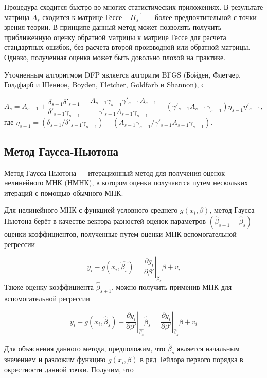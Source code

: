 Процедура сходится быстро во многих статистических приложениях. В результате матрица $A_s$ сходится к матрице Гессе $- H^{-1}_s$ --- более предпочтительной с точки зрения теории. В принципе данный метод может позволять получить приближенную оценку обратной матрицы к матрице Гессе для расчета стандартных ошибок, без расчета второй производной или обратной матрицы. Однако, полученная оценка может быть довольно плохой на практике.

Уточненным алгоритмом DFP является алгоритм BFGS (Бойден, Флетчер, Голдфарб и Шеннон, Boyden, Fletcher, Goldfarb и Shannon), с

\begin{equation}
A_s = A_{s-1}+\dfrac{\delta_{s-1}\delta'_{s-1}}{\delta'_{s-1}\gamma_{s-1}}+\dfrac{A_{s-1}\gamma_{s-1}\gamma'_{s-1}A_{s-1}}{\gamma'_{s-1}A_{s-1}\gamma_{s-1}}
-(\gamma'_{s-1}A_{s-1}\gamma_{s-1})\eta_{s-1}\eta'_{s-1},
\end{equation}
где $\eta_{s-1} = (\delta_{s-1}/\delta'_{s-1}\gamma_{s-1})-(A_{s-1}\gamma_{s-1}/\gamma'_{s-1}A_{s-1}\gamma_{s-1})$.


\subsection{Метод Гаусса-Ньютона}

Метод Гаусса-Ньютона --- итерационный метод для получения оценок нелинейного МНК (НМНК), в котором оценки получаются путем нескольких итераций с помощью обычного МНК. 

Для нелинейного МНК с функцией условного среднего $g({x_i},\beta)$, метод Гаусса-Ньютона берёт в качестве вектора разностей оценок параметров $(\hat{\beta}_{s+1}-\hat{\beta}_s)$ оценки коэффициентов, полученные путем оценки МНК вспомогательной регрессии

\begin{equation}
y_{i}-g(x_{i},\hat{\beta_s})= \left. \frac{\partial{g_i}}{\partial{\beta}'} \right|_{\hat{\beta}_s} \beta+v_{i}
\end{equation}
Также оценку коэффициента $\hat{\beta}_{s+1}$, можно получить применив МНК для вспомогательной регрессии

\begin{equation}
\left. y_{i}-g(x_{i},\hat{\beta}_s)-\dfrac{\partial{g_i}}{\partial{\beta}'} \right|_{\hat{\beta_s}}\hat{\beta}_s= \left. \frac{\partial{g_i}}{\partial{\beta}'} \right|_{\hat{\beta}_s} \beta+v_{i}
\end{equation}

Для объяснения данного метода, предположим, что $\hat{\beta}_s$ является начальным значением и разложим функцию $g(x_{i},\beta)$ в ряд Тейлора первого порядка в окрестности данной точки. Получим, что

